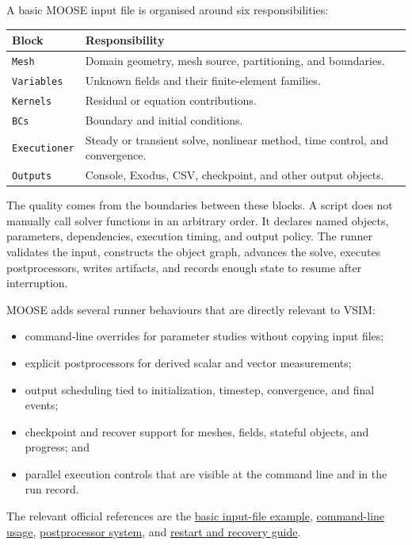 \documentclass[11pt,a4paper]{article}
\begin{document}
A basic MOOSE input file is organised around six responsibilities:

\begin{center}
\small
\begin{tabular}{lp{9.5cm}}
\toprule
\textbf{Block} & \textbf{Responsibility} \\
\midrule
\texttt{Mesh} & Domain geometry, mesh source, partitioning, and boundaries. \\
\texttt{Variables} & Unknown fields and their finite-element families. \\
\texttt{Kernels} & Residual or equation contributions. \\
\texttt{BCs} & Boundary and initial conditions. \\
\texttt{Executioner} & Steady or transient solve, nonlinear method, time control, and convergence. \\
\texttt{Outputs} & Console, Exodus, CSV, checkpoint, and other output objects. \\
\bottomrule
\end{tabular}
\end{center}

The quality comes from the boundaries between these blocks.  A script does
not manually call solver functions in an arbitrary order.  It declares named
objects, parameters, dependencies, execution timing, and output policy.  The
runner validates the input, constructs the object graph, advances the solve,
executes postprocessors, writes artifacts, and records enough state to resume
after interruption.

MOOSE adds several runner behaviours that are directly relevant to VSIM:

\begin{itemize}
  \item command-line overrides for parameter studies without copying input
        files;
  \item explicit postprocessors for derived scalar and vector measurements;
  \item output scheduling tied to initialization, timestep, convergence, and
        final events;
  \item checkpoint and recover support for meshes, fields, stateful objects,
        and progress; and
  \item parallel execution controls that are visible at the command line and
        in the run record.
\end{itemize}

The relevant official references are the
\href{https://mooseframework.inl.gov/docs/PRs/32596/site/getting_started/examples_and_tutorials/examples/ex01_inputfile.html}{basic
input-file example},
\href{https://mooseframework.inl.gov/moose/application_usage/command_line_usage.html}{command-line
usage},
\href{https://mooseframework.inl.gov/syntax/Postprocessors/}{postprocessor
system}, and
\href{https://mooseframework.inl.gov/docs/site/application_usage/restart_recover.html}{restart
and recovery guide}.
\end{document}
